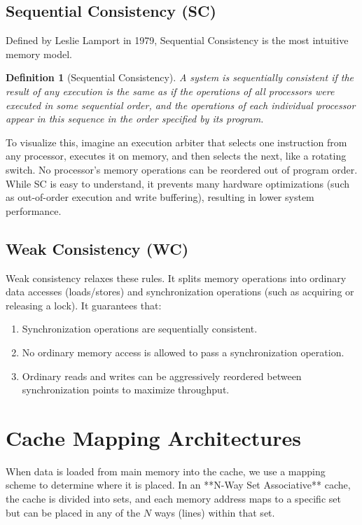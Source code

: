 \documentclass[12pt,a4paper,openany]{book}
\newtheorem{definition}{Definition}[chapter]
\begin{document}
\subsection{Sequential Consistency (SC)}
Defined by Leslie Lamport in 1979, Sequential Consistency is the most intuitive memory model.
\begin{definition}[Sequential Consistency]
    A system is sequentially consistent if the result of any execution is the same as if the operations of all processors were executed in some sequential order, and the operations of each individual processor appear in this sequence in the order specified by its program.
\end{definition}

To visualize this, imagine an execution arbiter that selects one instruction from any processor, executes it on memory, and then selects the next, like a rotating switch. No processor's memory operations can be reordered out of program order. While SC is easy to understand, it prevents many hardware optimizations (such as out-of-order execution and write buffering), resulting in lower system performance.

\subsection{Weak Consistency (WC)}
Weak consistency relaxes these rules. It splits memory operations into ordinary data accesses (loads/stores) and synchronization operations (such as acquiring or releasing a lock). It guarantees that:
\begin{enumerate}
    \item Synchronization operations are sequentially consistent.
    \item No ordinary memory access is allowed to pass a synchronization operation.
    \item Ordinary reads and writes can be aggressively reordered between synchronization points to maximize throughput.
\end{enumerate}

\section{Cache Mapping Architectures}
When data is loaded from main memory into the cache, we use a mapping scheme to determine where it is placed. In an **N-Way Set Associative** cache, the cache is divided into sets, and each memory address maps to a specific set but can be placed in any of the $N$ ways (lines) within that set.
\end{document}
